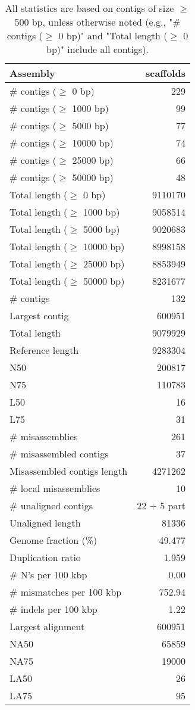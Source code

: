 \documentclass[12pt,a4paper]{article}
\begin{document}
\begin{table}[ht]
\begin{center}
\caption{All statistics are based on contigs of size $\geq$ 500 bp, unless otherwise noted (e.g., "\# contigs ($\geq$ 0 bp)" and "Total length ($\geq$ 0 bp)" include all contigs).}
\begin{tabular}{|l*{1}{|r}|}
\hline
Assembly & scaffolds \\ \hline
\# contigs ($\geq$ 0 bp) & 229 \\ \hline
\# contigs ($\geq$ 1000 bp) & 99 \\ \hline
\# contigs ($\geq$ 5000 bp) & 77 \\ \hline
\# contigs ($\geq$ 10000 bp) & 74 \\ \hline
\# contigs ($\geq$ 25000 bp) & 66 \\ \hline
\# contigs ($\geq$ 50000 bp) & 48 \\ \hline
Total length ($\geq$ 0 bp) & 9110170 \\ \hline
Total length ($\geq$ 1000 bp) & 9058514 \\ \hline
Total length ($\geq$ 5000 bp) & 9020683 \\ \hline
Total length ($\geq$ 10000 bp) & 8998158 \\ \hline
Total length ($\geq$ 25000 bp) & 8853949 \\ \hline
Total length ($\geq$ 50000 bp) & 8231677 \\ \hline
\# contigs & 132 \\ \hline
Largest contig & 600951 \\ \hline
Total length & 9079929 \\ \hline
Reference length & 9283304 \\ \hline
N50 & 200817 \\ \hline
N75 & 110783 \\ \hline
L50 & 16 \\ \hline
L75 & 31 \\ \hline
\# misassemblies & 261 \\ \hline
\# misassembled contigs & 37 \\ \hline
Misassembled contigs length & 4271262 \\ \hline
\# local misassemblies & 10 \\ \hline
\# unaligned contigs & 22 + 5 part \\ \hline
Unaligned length & 81336 \\ \hline
Genome fraction (\%) & 49.477 \\ \hline
Duplication ratio & 1.959 \\ \hline
\# N's per 100 kbp & 0.00 \\ \hline
\# mismatches per 100 kbp & 752.94 \\ \hline
\# indels per 100 kbp & 1.22 \\ \hline
Largest alignment & 600951 \\ \hline
NA50 & 65859 \\ \hline
NA75 & 19000 \\ \hline
LA50 & 26 \\ \hline
LA75 & 95 \\ \hline
\end{tabular}
\end{center}
\end{table}
\end{document}
